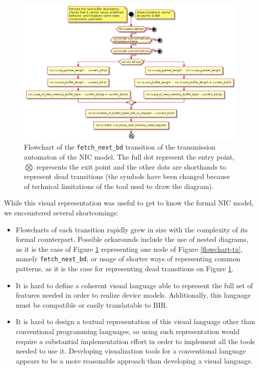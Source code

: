 \documentclass{kththesis}
\begin{document}
\begin{figure}[h]
	\includegraphics[width=\textwidth]{figures/flowchart-tx_fetch_next_bd.png}
	\centering
	\caption{Flowchart of the \texttt{fetch\_next\_bd} transition of the transmission automaton of the NIC model. The full dot represent the entry point, $\bigotimes$ represents the exit point and the other dots are shorthands to represent dead transitions (the symbols have been changed because of technical limitations of the tool used to draw the diagram).}
	\label{flowchart-tx_fetch_next_bd}
\end{figure}

While this visual representation was useful to get to know the formal NIC model, we encountered several shortcomings:

\begin{itemize}
    \item Flowcharts of each transition rapidly grew in size with the complexity of its formal counterpart. Possible orkarounds include the use of nested diagrams, as it is the case of Figure \ref{flowchart-tx_fetch_next_bd} representing one node of Figure \ref{flowchart-tx}, namely \texttt{fetch\_next\_bd}, or usage of shorter ways of representing common patterns, as it is the case for representing dead transitions on Figure \ref{flowchart-tx_fetch_next_bd}.
    \item It is hard to define a coherent visual language able to represent the full set of features needed in order to realize device models. Additionally, this language must be compatible or easily translatable to BIR.
    \item It is hard to design a textual representation of this visual language other than conventional programming languages, so using such representation would require a substantial implementation effort in order to implement all the tools needed to use it. Developing visualization tools for a conventional language appears to be a more reasonable approach than developing a visual language.
\end{itemize}
\end{document}
